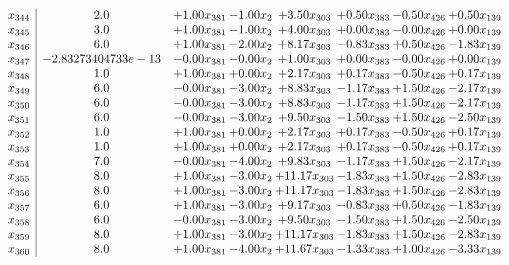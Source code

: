 \documentclass[8pt]{article}
\begin{document}
\[\begin{array}{c| c c@{\hskip 2pt} c@{\hskip 2pt} c@{\hskip 2pt} c@{\hskip 2pt} c@{\hskip 2pt} c@{\hskip 2pt} }
 x_{344}   &  2.0 & +  1.00 x_{381} & -1.00 x_{2} & +  3.50 x_{303} & +  0.50 x_{383} & -0.50 x_{426} & +  0.50 x_{139}\\
 x_{345}   &  3.0 & +  1.00 x_{381} & -1.00 x_{2} & +  4.00 x_{303} & +  0.00 x_{383} & -0.00 x_{426} & +  0.00 x_{139}\\
 x_{346}   &  6.0 & +  1.00 x_{381} & -2.00 x_{2} & +  8.17 x_{303} & -0.83 x_{383} & +  0.50 x_{426} & -1.83 x_{139}\\
 x_{347}   &  -2.83273404733e-13 & -0.00 x_{381} & -0.00 x_{2} & +  1.00 x_{303} & +  0.00 x_{383} & -0.00 x_{426} & +  0.00 x_{139}\\
 x_{348}   &  1.0 & +  1.00 x_{381} & +  0.00 x_{2} & +  2.17 x_{303} & +  0.17 x_{383} & -0.50 x_{426} & +  0.17 x_{139}\\
 x_{349}   &  6.0 & -0.00 x_{381} & -3.00 x_{2} & +  8.83 x_{303} & -1.17 x_{383} & +  1.50 x_{426} & -2.17 x_{139}\\
 x_{350}   &  6.0 & -0.00 x_{381} & -3.00 x_{2} & +  8.83 x_{303} & -1.17 x_{383} & +  1.50 x_{426} & -2.17 x_{139}\\
 x_{351}   &  6.0 & -0.00 x_{381} & -3.00 x_{2} & +  9.50 x_{303} & -1.50 x_{383} & +  1.50 x_{426} & -2.50 x_{139}\\
 x_{352}   &  1.0 & +  1.00 x_{381} & +  0.00 x_{2} & +  2.17 x_{303} & +  0.17 x_{383} & -0.50 x_{426} & +  0.17 x_{139}\\
 x_{353}   &  1.0 & +  1.00 x_{381} & +  0.00 x_{2} & +  2.17 x_{303} & +  0.17 x_{383} & -0.50 x_{426} & +  0.17 x_{139}\\
 x_{354}   &  7.0 & -0.00 x_{381} & -4.00 x_{2} & +  9.83 x_{303} & -1.17 x_{383} & +  1.50 x_{426} & -2.17 x_{139}\\
 x_{355}   &  8.0 & +  1.00 x_{381} & -3.00 x_{2} & + 11.17 x_{303} & -1.83 x_{383} & +  1.50 x_{426} & -2.83 x_{139}\\
 x_{356}   &  8.0 & +  1.00 x_{381} & -3.00 x_{2} & + 11.17 x_{303} & -1.83 x_{383} & +  1.50 x_{426} & -2.83 x_{139}\\
 x_{357}   &  6.0 & +  1.00 x_{381} & -3.00 x_{2} & +  9.17 x_{303} & -0.83 x_{383} & +  0.50 x_{426} & -1.83 x_{139}\\
 x_{358}   &  6.0 & -0.00 x_{381} & -3.00 x_{2} & +  9.50 x_{303} & -1.50 x_{383} & +  1.50 x_{426} & -2.50 x_{139}\\
 x_{359}   &  8.0 & +  1.00 x_{381} & -3.00 x_{2} & + 11.17 x_{303} & -1.83 x_{383} & +  1.50 x_{426} & -2.83 x_{139}\\
 x_{360}   &  8.0 & +  1.00 x_{381} & -4.00 x_{2} & + 11.67 x_{303} & -1.33 x_{383} & +  1.00 x_{426} & -3.33 x_{139}\\

\end{array}\]
\end{document}
